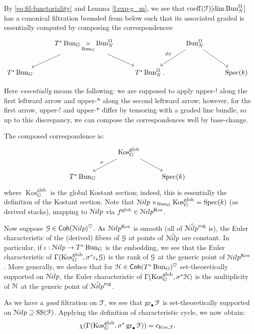 \documentclass[reqno,11pt]{amsart}
\numberwithin{equation}{subsection}
\theoremstyle{remark}
\newcommand{\sF}{{\EuScript F}}
\newcommand{\sG}{{\EuScript G}}
\newcommand{\sH}{{\EuScript H}}
\newcommand{\sN}{{\EuScript N}}
\newcommand{\on}{\operatorname}
\newcommand{\Spec}{\on{Spec}}
\newcommand{\gr}{\on{gr}}
\renewcommand{\dot}{\bullet}
\newcommand{\Bun}{\on{Bun}}
\newcommand{\heart}{\heartsuit}
\newcommand{\Coh}{\mathsf{Coh}}
\renewcommand{\o}[1]{\mathring{#1}}
\renewcommand{\supset}{\supseteq}
\newcommand{\coeff}{\on{coeff}}
\newcommand{\Nilp}{\sN ilp}
\newcommand{\Kos}{\on{Kos}}
\renewcommand{\SS}{\on{SS}}
\begin{document}
By \eqref{eq:fil-functoriality} and Lemma \ref{l:exp-g_m}, 
we see that $\coeff(\sF)[\dim \Bun_N^{\Omega}]$ has a canonical filtration bounded
from below such that its associated graded is essentially computed
by composing the correspondences:
%
\[
\begin{tikzcd}
&
T^*\Bun_G \underset{\Bun_G}{\times} \Bun_N^{\Omega} 
\arrow[dl] 
\arrow[dr]
&& 
\Bun_N^{\Omega}
\arrow[dl,"d\psi",swap]
\arrow[dr]
\\
T^*\Bun_G 
&&
T^*\Bun_N^{\Omega}.
&&
\Spec(k)
\end{tikzcd}
\]

\noindent Here \emph{essentially} means the following:
we are supposed to apply upper-$!$ along the first leftward
arrow and upper-$*$ along the second leftward arrow; however, for the first
arrow, upper-$!$ and upper-$*$ differ by tensoring with a graded line
bundle, so up to this discrepancy, we can compose the correspondences
well by base-change.

The composed correspondence is:
%
\[
\begin{tikzcd}
& \Kos_G^{\on{glob}} 
\arrow[dl,"\sigma",swap]
\arrow[dr]
\\
T^*\Bun_G
&&
\Spec(k)
\end{tikzcd}
\]
where $\Kos_G^{\on{glob}}$ is the global Kostant section;
indeed, this is essentially the definition of the Kostant section. 
Note that $\Nilp \times_{\Bun_G} \Kos_G^{\on{glob}} = \Spec(k)$ (as derived stacks), mapping to
$\Nilp$ via $f^{\on{glob}} \in \Nilp^{\Kos}$. 

Now suppose $\sG \in \Coh(\Nilp)^{\heart}$.
As $\Nilp^{\Kos}$ is smooth (all of $\o{\Nilp}^{\on{reg}}$ is), the
Euler characteristic of the (derived) fibers of $\sG$ at points
of $\o{\Nilp}$ are constant. In particular, if $\iota:\Nilp \to T^*\Bun_G$
is the embedding, we see that the Euler characteristic 
of $\Gamma(\Kos_G^{\on{glob}},\sigma^*\iota_*\sG)$
is the rank of $\sG$ at the generic point of $\Nilp^{\Kos}$.
More generally, we deduce that for $\sH \in \Coh(T^*\Bun_G)^{\heart}$
set-theoretically supported on $\Nilp$, the Euler 
characteristic of $\Gamma(\Kos_G^{\on{glob}},\sigma^*\sH)$ is the multiplicity
of $\sH$ at the generic point of $\o{\Nilp}^{\on{reg}}$.

As we have a \emph{good} filtration on $\sF$, we see that $\gr_{\dot} \sF$
is set-theoretically supported on $\Nilp \supset \SS(\sF)$.
Applying the definition of characteristic cycle, we now obtain:
%
\[
\chi(\Gamma(\Kos_G^{\on{glob}},\sigma^*\gr_{\dot} \sF)) = c_{\Kos,\sF}.
\]
\end{document}
